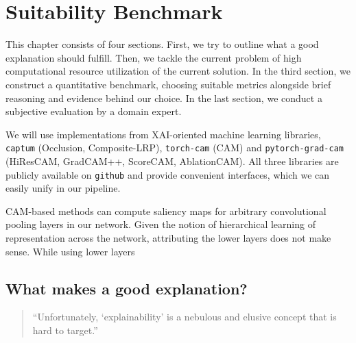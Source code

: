 \chapter{Suitability Benchmark}\label{experiment}

This chapter consists of four sections. First, we try to outline what a good explanation should fulfill. Then, we tackle the current problem of high computational resource utilization of the current solution. In the third section, we construct a quantitative benchmark, choosing suitable metrics alongside brief reasoning and evidence behind our choice. In the last section, we conduct a subjective evaluation by a domain expert.

We will use implementations from XAI-oriented machine learning libraries, \texttt{captum} (Occlusion, Composite-LRP), \texttt{torch-cam} (CAM) and \texttt{pytorch-grad-cam} (HiResCAM, GradCAM++, ScoreCAM, AblationCAM). All three libraries are publicly available on \texttt{github} and provide convenient interfaces, which we can easily unify in our pipeline.

CAM-based methods can compute saliency maps for arbitrary convolutional pooling layers in our network.
Given the notion of hierarchical learning of representation across the network, attributing the lower layers does not make sense.
While using lower layers 

\section{What makes a good explanation?}

\begin{quote}
    {\small``Unfortunately, `explainability' is a nebulous and elusive concept that is hard to target.'' \cite{explainability-hard}}
\end{quote}

